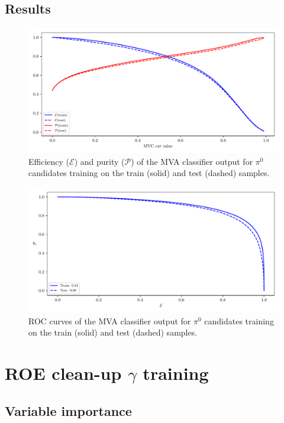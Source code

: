 \documentclass[headings=standardclasses,headings=big,oneside,a4paper,openany,12pt]{scrbook}
\begin{document}
\subsection*{Results}

\begin{figure}[H]
\centering
\captionsetup{width=0.8\linewidth}
\includegraphics[width=\linewidth]{fig/addendums/pi0_effpur}
\caption{Efficiency ($\mathcal{E}$) and purity ($\mathcal{P}$) of the MVA classifier output for $\pi^0$ candidates training on the train (solid) and test (dashed) samples.}
\end{figure}

\begin{figure}[H]
\centering
\captionsetup{width=0.8\linewidth}
\includegraphics[width=\linewidth]{fig/addendums/pi0_roc}
\caption{ROC curves of the MVA classifier output for $\pi^0$ candidates training on the train (solid) and test (dashed) samples.}
\end{figure}

\section*{ROE clean-up $\gamma$ training}

\subsection*{Variable importance}
\end{document}
